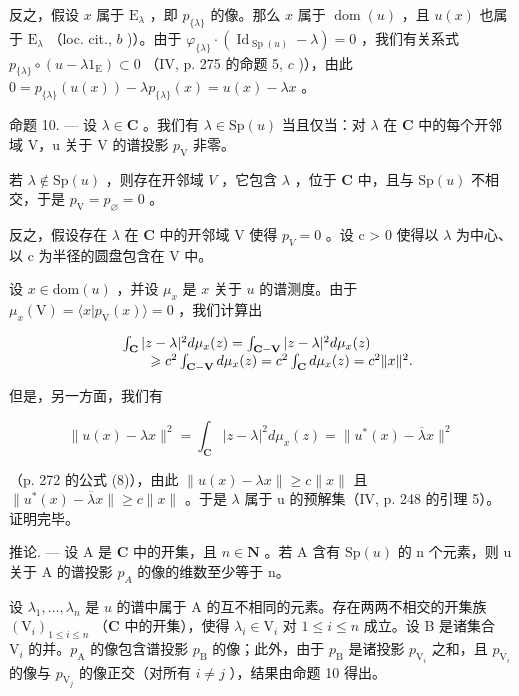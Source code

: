 反之，假设 \(x\) 属于 \(\mathrm{E}_{\lambda}\) ，即 \(p_{\{\lambda\}}\) 的像。那么 \(x\) 属于 \(\operatorname{dom}(u)\) ，且 \(u(x)\) 也属于 \(\mathrm{E}_{\lambda}\) （loc. cit., \(b\) )）。由于 \(\varphi_{\{\lambda\}} \cdot (\operatorname{Id}_{\operatorname{Sp}(u)} - \lambda) = 0\) ，我们有关系式 \(p_{\{\lambda\}} \circ (u - \lambda 1_{\mathrm{E}}) \subset 0\) （IV, p. 275 的命题 5, \(c\) )），由此 \(0 = p_{\{\lambda\}}(u(x)) - \lambda p_{\{\lambda\}}(x) = u(x) - \lambda x\) 。

命题 10. — 设 \(\lambda \in \mathbf{C}\) 。我们有 \(\lambda \in \mathrm{Sp}(u)\) 当且仅当：对 \(\lambda\) 在 \(\mathbf{C}\) 中的每个开邻域 V，u 关于 V 的谱投影 \(p_{\mathrm{V}}\) 非零。

若 \(\lambda \notin \mathrm{Sp}(u)\) ，则存在开邻域 \(V\) ，它包含 \(\lambda\) ，位于 \(\mathbf{C}\) 中，且与 \(\mathrm{Sp}(u)\) 不相交，于是 \(p_{\mathrm{V}} = p_{\varnothing} = 0\) 。

反之，假设存在 \(\lambda\) 在 \(\mathbf{C}\) 中的开邻域 V 使得 \(p_{V} = 0\) 。设 c > 0 使得以 \(\lambda\) 为中心、以 c 为半径的圆盘包含在 V 中。

设 \(x \in \mathrm{dom}(u)\) ，并设 \(\mu_x\) 是 \(x\) 关于 \(u\) 的谱测度。由于 \(\mu_x(\mathrm{V}) = \langle x | p_{\mathrm{V}}(x) \rangle = 0\) ，我们计算出

\[
\begin{array}{r l} & {\int_ {\mathbf {C}} | z - \lambda | ^ {2} d \mu_ {x} (z) = \int_ {\mathbf {C - V}} | z - \lambda | ^ {2} d \mu_ {x} (z)} \\ & {\qquad \geqslant c ^ {2} \int_ {\mathbf {C - V}} d \mu_ {x} (z) = c ^ {2} \int_ {\mathbf {C}} d \mu_ {x} (z) = c ^ {2} \| x \| ^ {2}.} \end{array}
\]

但是，另一方面，我们有

\[
\| u (x) - \lambda x \| ^ {2} = \int_ {\mathbf {C}} | z - \lambda | ^ {2} d \mu_ {x} (z) = \| u ^ {*} (x) - \overline {{\lambda}} x \| ^ {2}
\]

（p. 272 的公式 (8)），由此 \(\|u(x)-\lambda x\|\geqslant c\|x\|\) 且 \(\|u^{*}(x)-\overline{\lambda}x\|\geqslant c\|x\|\) 。于是 \(\lambda\) 属于 u 的预解集（IV, p. 248 的引理 5）。证明完毕。

推论. — 设 A 是 \(\mathbf{C}\) 中的开集，且 \(n \in \mathbf N\) 。若 A 含有 \(\mathrm{Sp}(u)\) 的 n 个元素，则 u 关于 A 的谱投影 \(p_{A}\) 的像的维数至少等于 n。

设 \(\lambda_1, \ldots, \lambda_n\) 是 \(u\) 的谱中属于 A 的互不相同的元素。存在两两不相交的开集族 \((\mathrm{V}_i)_{1 \leqslant i \leqslant n}\) （\(\mathbf{C}\) 中的开集），使得 \(\lambda_i \in \mathrm{V}_i\) 对 \(1 \leqslant i \leqslant n\) 成立。设 B 是诸集合 \(\mathrm{V}_i\) 的并。\(p_{\mathrm{A}}\) 的像包含谱投影 \(p_{\mathrm{B}}\) 的像；此外，由于 \(p_{\mathrm{B}}\) 是诸投影 \(p_{\mathrm{V}_i}\) 之和，且 \(p_{\mathrm{V}_i}\) 的像与 \(p_{\mathrm{V}_j}\) 的像正交（对所有 \(i \neq j\) ），结果由命题 10 得出。

